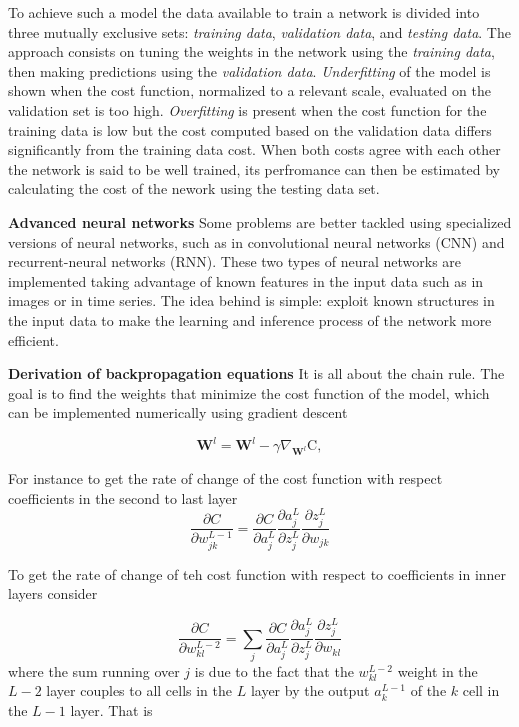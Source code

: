 \documentclass[11pt,onecolumn]{article}
\begin{document}
To achieve such a model the data available to train a network is divided into three mutually exclusive sets: 
\emph{training data}, \emph{validation data}, and \emph{testing data}. 
The approach consists on tuning the weights in the 
network using the \emph{training data}, then making predictions using the \emph{validation data}. 
\emph{Underfitting} of the model is shown when the cost function, normalized to a relevant scale,  evaluated on the validation set 
is too high. 
\emph{Overfitting} is present when the cost function for the training data is low but the cost computed based on 
the validation data differs significantly from the training data cost. 
When both costs agree with each other the network is said to be well trained, its perfromance can then be 
estimated by calculating the cost of the nework using the testing data set. 

\textbf{Advanced neural networks}
Some problems are better tackled using specialized versions of neural networks, such as in convolutional 
neural networks (CNN) and recurrent-neural networks (RNN). These two types of neural networks are 
implemented taking advantage of known features in the input data such as in images or in time series. 
The idea behind is simple: exploit known structures in the input data to make the learning and inference 
process of the network more efficient.

\textbf{Derivation of backpropagation equations} It is all about the chain rule. The goal is to find
the weights that minimize the cost function of the model, which can be implemented numerically 
using gradient descent 

\begin{equation}
	\mathbf{W}^{l} = \mathbf{W}^{l} - \gamma \nabla_{\mathbf{W}^{l}} \mathrm{C},
\end{equation}

For instance to get the rate of change of the cost function with respect
 coefficients in the second to last layer
\begin{equation}
    \frac{\partial C}{\partial w^{L-1}_{jk}} =  \frac{\partial C}{\partial a^{L}_j} 
                                               \frac{\partial a^{L}_j}{\partial z^{L}_j}
                                               \frac{\partial z^{L}_j}{\partial w_{jk} }
\end{equation}

To get the rate of change of teh cost function with respect to coefficients in inner layers consider 

\begin{equation}
    \frac{\partial C}{\partial w^{L-2}_{kl}} = \sum_j \frac{\partial C}{\partial a^{L}_j} 
                                               \frac{\partial a^{L}_j}{\partial z^{L}_j}
                                               \frac{\partial z^{L}_j}{\partial w_{kl} }
\end{equation}    
where the sum running over $j$ is due to the fact that the $ w^{L-2}_{kl} $ weight
in the $L-2$ layer couples to all cells in the $L$ layer by the output $a^{L-1}_k$ of the $k$ cell 
in the $L-1$ layer.  That is 
\end{document}
